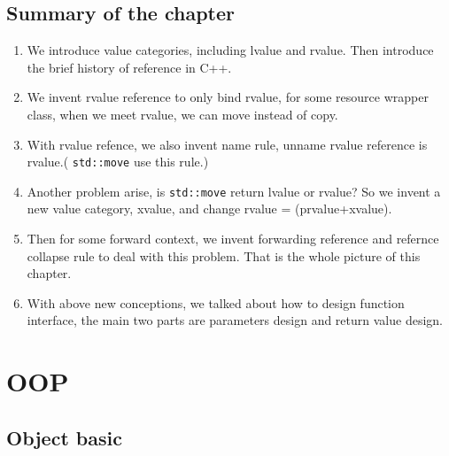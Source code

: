 \documentclass[a4paper,11pt,twoside]{book}
\begin{document}
\section{Summary of the chapter}
\begin{enumerate}
		\item We introduce value categories, including lvalue and rvalue. Then introduce the brief history of reference in C++.
		\item We invent rvalue reference to only bind rvalue, for some resource wrapper class, when we meet rvalue, we can move instead of copy.
		\item With rvalue refence, we also invent name rule, unname rvalue reference is rvalue.( \texttt{std::move} use this rule.) 
		\item Another problem arise, is \texttt{std::move} return lvalue or rvalue? So we invent a new value category, xvalue, and change rvalue = (prvalue+xvalue).

		\item Then for some forward context, we invent forwarding reference and refernce collapse rule to deal with this problem. That is the whole picture of this chapter.
				
		\item With above new conceptions, we talked about how to design function interface, the main two parts are parameters design and return value design. 
\end{enumerate}



\chapter{OOP}

\section{Object basic}
\end{document}
